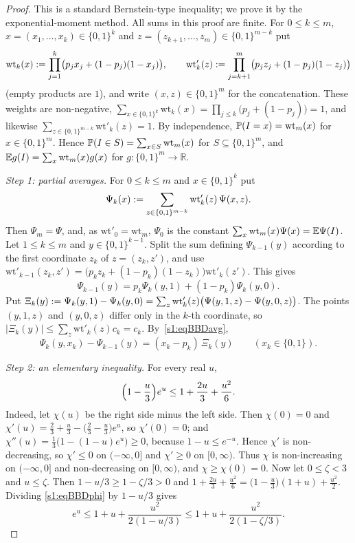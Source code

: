\begin{proof}
This is a standard Bernstein-type inequality; we prove it by the
exponential-moment method. All sums in this proof are finite. For
$0\le k\le m$, $x=(x_1,\dots,x_k)\in\{0,1\}^k$ and
$z=(z_{k+1},\dots,z_m)\in\{0,1\}^{m-k}$ put
\[
\mathrm{wt}_k(x)\mathrel{:=}\prod_{j=1}^{k}\bigl(p_jx_j+(1-p_j)(1-x_j)\bigr),\qquad
\mathrm{wt}'_k(z)\mathrel{:=}\prod_{j=k+1}^{m}\bigl(p_jz_j+(1-p_j)(1-z_j)\bigr)
\]
(empty products are $1$), and write $(x,z)\in\{0,1\}^m$ for the
concatenation. These weights are non-negative,
$\sum_{x\in\{0,1\}^k}\mathrm{wt}_k(x)=\prod_{j\le k}\bigl(p_j+(1-p_j)\bigr)=1$, and
likewise $\sum_{z\in\{0,1\}^{m-k}}\mathrm{wt}'_k(z)=1$. By independence,
$\mathbb{P}(I=x)=\mathrm{wt}_m(x)$ for $x\in\{0,1\}^m$. Hence
$\mathbb{P}(I\in S)=\sum_{x\in S}\mathrm{wt}_m(x)$ for $S\subseteq\{0,1\}^m$, and
$\mathbb{E} g(I)=\sum_{x}\mathrm{wt}_m(x)g(x)$ for $g\colon\{0,1\}^m\to\mathbb{R}$.

\emph{Step 1: partial averages.} For $0\le k\le m$ and $x\in\{0,1\}^k$ put
\[
\Psi_k(x)\mathrel{:=}\sum_{z\in\{0,1\}^{m-k}}\mathrm{wt}'_k(z)\,\Psi(x,z).
\]
Then
$\Psi_m=\Psi$, and, as $\mathrm{wt}'_0=\mathrm{wt}_m$, $\Psi_0$ is the constant
$\sum_x\mathrm{wt}_m(x)\Psi(x)=\mathbb{E}\Psi(I)$. Let $1\le k\le m$ and
$y\in\{0,1\}^{k-1}$. Split the sum defining $\Psi_{k-1}(y)$ according to
the first coordinate $z_k$ of $z=(z_k,z')$, and use
$\mathrm{wt}'_{k-1}(z_k,z')=\bigl(p_kz_k+(1-p_k)(1-z_k)\bigr)\mathrm{wt}'_k(z')$. This gives
\begin{equation}\label{s1:eqBBDavg}
\Psi_{k-1}(y)=p_k\Psi_k(y,1)+(1-p_k)\Psi_k(y,0).
\end{equation}
Put $\Xi_k(y)\mathrel{:=}\Psi_k(y,1)-\Psi_k(y,0)
=\sum_{z}\mathrm{wt}'_k(z)\bigl(\Psi(y,1,z)-\Psi(y,0,z)\bigr)$. The points
$(y,1,z)$ and $(y,0,z)$ differ only in the $k$-th coordinate, so
$|\Xi_k(y)|\le\sum_z\mathrm{wt}'_k(z)c_k=c_k$. By~\eqref{s1:eqBBDavg},
\begin{equation}\label{s1:eqBBDdiff}
\Psi_k(y,x_k)-\Psi_{k-1}(y)=(x_k-p_k)\,\Xi_k(y)\qquad(x_k\in\{0,1\}).
\end{equation}

\emph{Step 2: an elementary inequality.} For every real $u$,
\begin{equation}\label{s1:eqBBDphi}
\Bigl(1-\frac u3\Bigr)e^u\le1+\frac{2u}3+\frac{u^2}6 .
\end{equation}
Indeed, let $\chi(u)$ be the right side minus the left side. Then
$\chi(0)=0$ and
$\chi'(u)=\frac23+\frac u3-\bigl(\frac23-\frac u3\bigr)e^u$, so
$\chi'(0)=0$; and $\chi''(u)=\frac13\bigl(1-(1-u)e^u\bigr)\ge0$,
because $1-u\le e^{-u}$. Hence $\chi'$ is non-decreasing, so
$\chi'\le0$ on $(-\infty,0]$ and $\chi'\ge0$ on $[0,\infty)$. Thus
$\chi$ is non-increasing on $(-\infty,0]$ and non-decreasing on
$[0,\infty)$, and $\chi\ge\chi(0)=0$. Now let $0\le\zeta<3$ and $u\le\zeta$.
Then $1-u/3\ge1-\zeta/3>0$ and
$1+\frac{2u}3+\frac{u^2}6=\bigl(1-\frac u3\bigr)(1+u)+\frac{u^2}2$. Dividing
\eqref{s1:eqBBDphi} by $1-u/3$ gives
\begin{equation}\label{s1:eqBBDexp}
e^u\le1+u+\frac{u^2}{2(1-u/3)}\le1+u+\frac{u^2}{2(1-\zeta/3)} .
\end{equation}


\end{proof}
